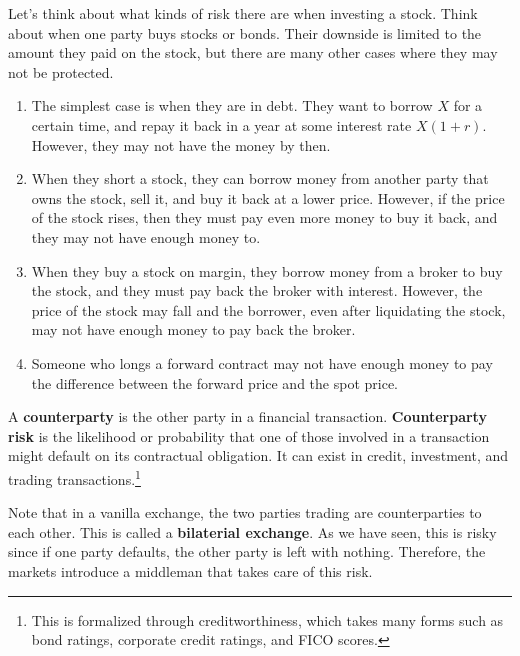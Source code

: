 \documentclass{article}
\begin{document}
    \begin{example}
      \label{ex:risks-associated-with-trades}
      Let's think about what kinds of risk there are when investing a stock. Think about when one party buys stocks or bonds. Their downside is limited to the amount they paid on the stock, but there are many other cases where they may not be protected. 
      \begin{enumerate}
        \item The simplest case is when they are in debt. They want to borrow $X$ for a certain time, and repay it back in a year at some interest rate $X (1 + r)$. However, they may not have the money by then. 
        \item When they short a stock, they can borrow money from another party that owns the stock, sell it, and buy it back at a lower price. However, if the price of the stock rises, then they must pay even more money to buy it back, and they may not have enough money to. 
        \item When they buy a stock on margin, they borrow money from a broker to buy the stock, and they must pay back the broker with interest. However, the price of the stock may fall and the borrower, even after liquidating the stock, may not have enough money to pay back the broker.
        \item Someone who longs a forward contract may not have enough money to pay the difference between the forward price and the spot price.
      \end{enumerate}
    \end{example}

    \begin{definition}[Counterparty]
      \label{def:counterparty}
      A \textbf{counterparty} is the other party in a financial transaction. \textbf{Counterparty risk} is the likelihood or probability that one of those involved in a transaction might default on its contractual obligation. It can exist in credit, investment, and trading transactions.\footnote{This is formalized through creditworthiness, which takes many forms such as bond ratings, corporate credit ratings, and FICO scores.}
    \end{definition}
    
    Note that in a vanilla exchange, the two parties trading are counterparties to each other. This is called a \textbf{bilaterial exchange}. As we have seen, this is risky since if one party defaults, the other party is left with nothing. Therefore, the markets introduce a middleman that takes care of this risk. 
\end{document}
